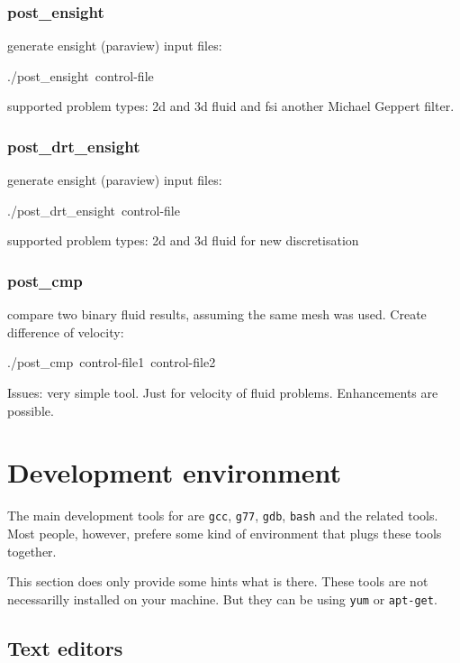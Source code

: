 \subsubsection{post\_ensight}

generate ensight (paraview) input files:

\begin{lyxcode}
./post\_ensight~control-file
\end{lyxcode}
supported problem types: 2d and 3d fluid and fsi another Michael Geppert
filter.


\subsubsection{post\_drt\_ensight}

generate ensight (paraview) input files:

\begin{lyxcode}
./post\_drt\_ensight~control-file
\end{lyxcode}
supported problem types: 2d and 3d fluid for new discretisation


\subsubsection{post\_cmp}

compare two binary fluid results, assuming the same mesh was used.
Create difference of velocity:

\begin{lyxcode}
./post\_cmp~control-file1~control-file2
\end{lyxcode}
Issues: very simple tool. Just for velocity of fluid problems. Enhancements
are possible.


\section{Development environment}

The main development tools for \ccarat{} are \texttt{gcc}, \texttt{g77},
\texttt{gdb}, \texttt{bash} and the related tools. Most people, however,
prefere some kind of environment that plugs these tools together.

This section does only provide some hints what is there. These tools
are not necessarilly installed on your machine. But they can be using
\texttt{yum} or \texttt{apt-get}.


\subsection{Text editors \label{sec:Text-editors}}

